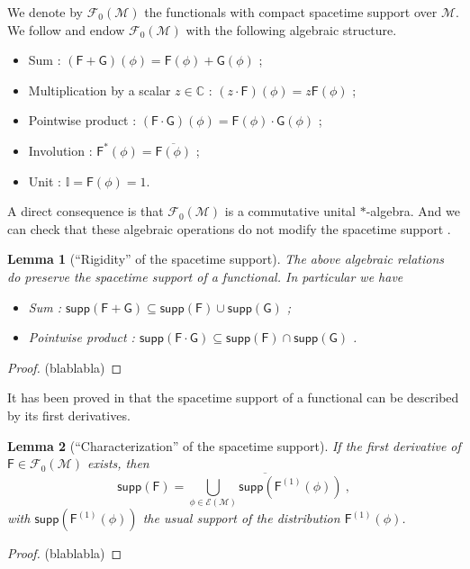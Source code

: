 \documentclass[11pt]{book}
\newcommand{\supp}{\mathsf{supp}}
\newcommand{\Ecal}{\mathcal{E}}
\newcommand{\Fcal}{\mathcal{F}}
\newcommand{\Mcal}{\mathcal{M}}
\newcommand{\Cbb}{\mathbb{C}}
\newcommand{\Ibb}{\mathbb{I}}
\newcommand{\Fsf}{\mathsf{F}}
\newcommand{\Gsf}{\mathsf{G}}
\theoremstyle{break}
\newtheorem{lemma}{Lemma}
\newtheorem{proof}{Proof}
\begin{document}
We denote by $\Fcal_0(\Mcal)$ the functionals with compact spacetime support over $\Mcal$. We follow
\cite{Brunetti:2012ar} and endow $\Fcal_0(\Mcal)$ with the following algebraic structure.
%
\begin{itemize}
\item Sum : $(\Fsf+\Gsf)(\phi) = \Fsf(\phi) + \Gsf(\phi)$ ;
\item Multiplication by a scalar $z\in\Cbb$ : $(z \cdot \Fsf)(\phi) = z \Fsf(\phi)$ ;
\item Pointwise product : $(\Fsf \cdot \Gsf)(\phi) = \Fsf(\phi) \cdot \Gsf(\phi)$ ;
\item Involution : $\Fsf^\ast(\phi) = \overline{\Fsf(\phi)}$ ;
\item Unit : $\Ibb = \Fsf(\phi) = 1$.
\end{itemize}
%
A direct consequence is that $\Fcal_0(\Mcal)$ is a commutative unital $\ast$-algebra. And we can check that these algebraic operations do not modify the spacetime support \cite[Lemma 2.3.3]{Brunetti:2012ar}.%
%
\begin{lemma}[``Rigidity'' of the spacetime support] \label{lem:spacetime}
The above algebraic relations do preserve the spacetime support of a functional. In particular we have
%
\begin{itemize}
\item Sum : $\supp(\Fsf + \Gsf) \subseteq \supp(\Fsf) \cup \supp(\Gsf)$ ;
\item Pointwise product :  $\supp(\Fsf \cdot \Gsf) \subseteq \supp(\Fsf) \cap \supp(\Gsf)$ .
\end{itemize}
%
\end{lemma}
%
%
\begin{proof}
(blablabla)
\end{proof}
%
It has been proved in \cite[Lemma 2.3.8]{Brunetti:2012ar} that the spacetime support of a functional can be described by its first derivatives.%
%
\begin{lemma}[``Characterization'' of the spacetime support]
If the first derivative of $\Fsf\in\Fcal_0(\Mcal)$ exists, then
%
\begin{equation*}
\supp\left(\Fsf\right) = \overline{\bigcup_{\phi\in\Ecal(\Mcal)} \supp\left(\Fsf^{(1)}(\phi)\right)} \ ,
\end{equation*}
%
with $\supp\left(\Fsf^{(1)}(\phi)\right)$ the usual support of the distribution $\Fsf^{(1)}(\phi)$.
\end{lemma}
%
\begin{proof}
(blablabla) 
\end{proof}
\end{document}
